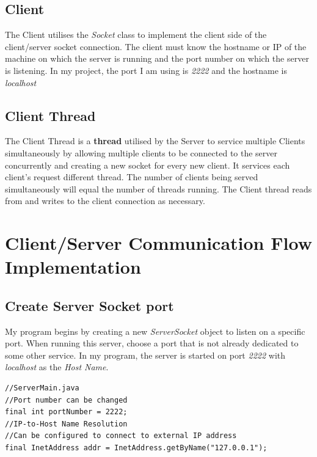\documentclass[a4paper,11pt]{article}
\begin{document}
\subsection{Client}
The Client utilises the \textit{Socket} class to implement the client side of the client/server socket connection. The client must know the hostname or IP of the machine on which the server is running and the port number on which the server is listening. In my project, the port I am using is \textit{2222} and the hostname is  \textit{localhost}

\subsection{Client Thread}
The Client Thread is a \textbf{thread} utilised by the Server to service multiple Clients simultaneously by allowing multiple clients to be connected to the server concurrently and creating  a new socket for every new client. It services each client's request different thread. The number of clients being served simultaneously will equal the number of threads running. The Client thread reads from and writes to the client connection as necessary.

\section{Client/Server Communication Flow Implementation}

\subsection{Create Server Socket port}
My program begins by creating a new \textit{ServerSocket} object to listen on a specific port. When running this server, choose a port that is not already dedicated to some other service. In my program, the server is started on port \textit{2222} with \textit{localhost} as the \textit{Host Name}.
\begin{mdframed}[backgroundcolor=light-gray, roundcorner=30pt,leftmargin=1, rightmargin=1, innerleftmargin=5, innertopmargin=-3,innerbottommargin=5, outerlinewidth=1, linecolor=light-gray]
\begin{lstlisting}
//ServerMain.java
//Port number can be changed
final int portNumber = 2222;
//IP-to-Host Name Resolution
//Can be configured to connect to external IP address
final InetAddress addr = InetAddress.getByName("127.0.0.1");
\end{lstlisting}
\end{mdframed}
\end{document}
